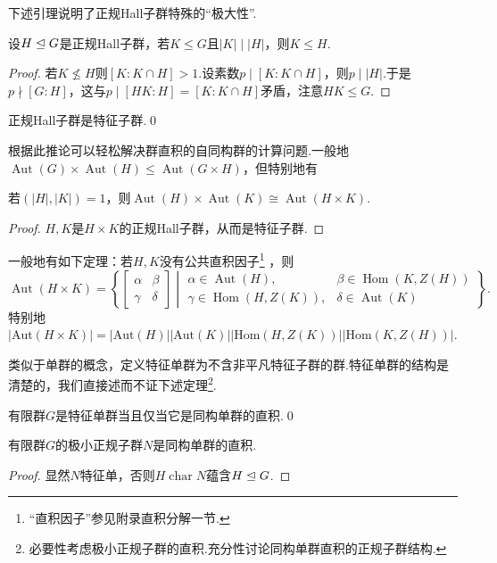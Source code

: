 下述引理说明了正规Hall子群特殊的“极大性”.
\begin{lemma*}
	设$H\trianglelefteq G$是正规Hall子群，若$K\le G$且$|K|\mid|H|$，则$K\le H$.
\end{lemma*}
\begin{proof}
	若$K\nleq H$则$[K:K\cap H]>1$.设素数$p\mid[K:K\cap H]$，则$p\mid|H|$.于是$p\nmid[G:H]$，这与$p\mid[HK:H]=[K:K\cap H]$矛盾，注意$HK\le G$.
\end{proof}
\begin{cor*}
	正规Hall子群是特征子群.\qed
\end{cor*}

根据此推论可以轻松解决群直积的自同构群的计算问题.一般地$\operatorname*{Aut}(G)\times\operatorname*{Aut}(H)\le\operatorname*{Aut}(G\times H)$，但特别地有
\begin{prop}
	若$(|H|,|K|)=1$，则$\operatorname*{Aut}(H)\times\operatorname*{Aut}(K)\cong\operatorname*{Aut}(H\times K)$.
\end{prop}
\begin{proof}
	$H,K$是$H\times K$的正规Hall子群，从而是特征子群.
\end{proof}
\begin{remark}
	一般地有如下定理：若$H,K$没有公共直积因子\footnote{“直积因子”参见附录直积分解一节.} ，则
	\[
		\operatorname*{Aut}(H\times K)=\left\{\begin{bmatrix}
			\alpha&\beta\\
			\gamma&\delta
		\end{bmatrix}\middle| \begin{array}{ll}
			\alpha\in\operatorname*{Aut}(H),&\beta\in\operatorname*{Hom}(K,Z(H))\\
			\gamma\in\operatorname*{Hom}(H,Z(K)),&\delta\in\operatorname*{Aut}(K)
		\end{array}\right\}.
	\]
	特别地$|\mathrm{Aut}(H\times K)|=|\mathrm{Aut}(H)||\mathrm{Aut}(K)||\mathrm{Hom}(H,Z(K))||\mathrm{Hom}(K,Z(H))|$.
\end{remark}

类似于单群的概念，定义{\heiti 特征单群}为不含非平凡特征子群的群.特征单群的结构是清楚的，我们直接述而不证下述定理\footnote{必要性考虑极小正规子群的直积.充分性讨论同构单群直积的正规子群结构.}.
\begin{thm}
	有限群$G$是特征单群当且仅当它是同构单群的直积.\qed
\end{thm}
\begin{cor*}
	有限群$G$的极小正规子群$N$是同构单群的直积.
\end{cor*}
\begin{proof}
	显然$N$特征单，否则$H\operatorname*{char}N$蕴含$H\trianglelefteq G$.
\end{proof}

